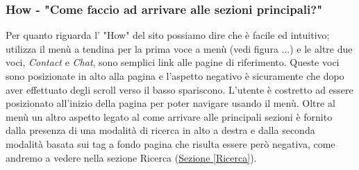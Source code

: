 \subsubsection{How - "Come faccio ad arrivare alle sezioni principali?"} \label{HHow}
Per quanto riguarda l' "How" del sito possiamo dire che è facile ed intuitivo; utilizza il menù a tendina per la prima voce a menù (vedi figura ...) e le altre due voci, \textit{Contact} e \textit{Chat}, sono semplici link alle pagine di riferimento.
Queste voci sono posizionate in alto alla pagina e l'aspetto negativo è sicuramente che dopo aver effettuato degli scroll verso il basso spariscono. L'utente è costretto ad essere posizionato all'inizio della pagina per poter navigare usando il menù.
Oltre al menù un altro aspetto legato al come arrivare alle principali sezioni è fornito dalla presenza di una modalità di ricerca in alto a destra e dalla seconda modalità basata sui tag a fondo pagina che risulta essere però negativa, come andremo a vedere nella sezione Ricerca (\hyperref[Ricerca]{Sezione \ref{Ricerca}}).






